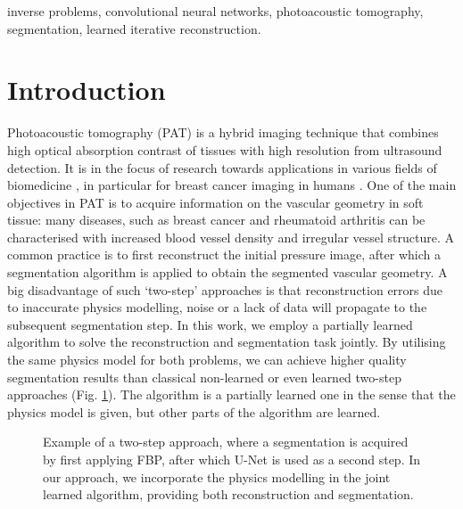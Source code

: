 \documentclass[journal]{IEEEtran}
\begin{document}
\begin{IEEEkeywords}
inverse problems, convolutional neural networks, photoacoustic tomography, segmentation, learned iterative reconstruction.
\end{IEEEkeywords}

\IEEEpeerreviewmaketitle
\vspace{-3.5mm}
\section{Introduction}
Photoacoustic tomography (PAT) is a hybrid imaging technique that combines high optical absorption contrast of tissues with high resolution from ultrasound detection. It is in the focus of research towards applications in various fields of biomedicine \cite{Zhou2016}, in particular for breast cancer imaging in humans \cite{Heijblom2015, Toi2017, Lin2018}. One of the main objectives in PAT is to acquire information on the vascular geometry in soft tissue: many diseases, such as breast cancer and rheumatoid arthritis can be characterised with increased blood vessel density and irregular vessel structure. A common practice is to first reconstruct the initial pressure image, after which a segmentation algorithm is applied to obtain the segmented vascular geometry. A big disadvantage of such `two-step' approaches is that reconstruction errors due to inaccurate physics modelling, noise or a lack of data will propagate to the subsequent segmentation step. In this work, we employ a partially learned algorithm to solve the reconstruction and segmentation task jointly. By utilising the {same} physics model for both problems, we can achieve higher quality segmentation results than classical non-learned or even learned two-step approaches (Fig. \ref{fig:UNet_vs_LPD}). {The algorithm is a partially learned one in the sense that the physics model is given, but other parts of the algorithm are learned}.

\begin{figure}[!ht]
\resizebox{\linewidth}{!}{%
\begin{tikzpicture}

\end{tikzpicture}}
\caption{Example of a two-step approach, where a segmentation is acquired by first applying FBP, after which U-Net is used as a second step. In our approach, we incorporate the physics modelling in the joint learned algorithm, providing both reconstruction and segmentation.}
\label{fig:UNet_vs_LPD}
\vspace{-4mm}
\end{figure}
\end{document}
